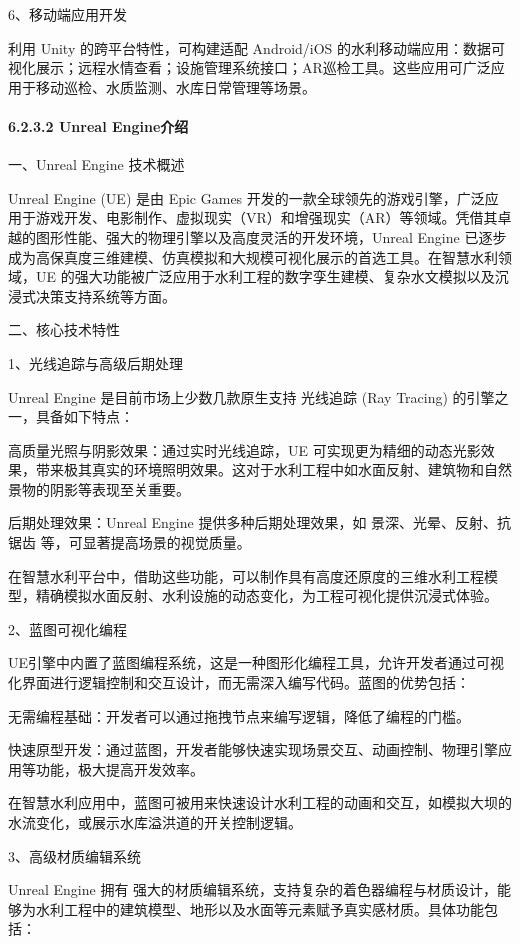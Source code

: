 6、移动端应用开发

利用 Unity 的跨平台特性，可构建适配 Android/iOS 的水利移动端应用：数据可视化展示；远程水情查看；设施管理系统接口；AR巡检工具。这些应用可广泛应用于移动巡检、水质监测、水库日常管理等场景。

\paragraph{6.2.3.2 Unreal Engine介绍}\label{unreal-engineux4ecbux7ecd}

一、Unreal Engine 技术概述

Unreal Engine (UE) 是由 Epic Games 开发的一款全球领先的游戏引擎，广泛应用于游戏开发、电影制作、虚拟现实（VR）和增强现实（AR）等领域。凭借其卓越的图形性能、强大的物理引擎以及高度灵活的开发环境，Unreal Engine 已逐步成为高保真度三维建模、仿真模拟和大规模可视化展示的首选工具。在智慧水利领域，UE 的强大功能被广泛应用于水利工程的数字孪生建模、复杂水文模拟以及沉浸式决策支持系统等方面。

二、核心技术特性

1、光线追踪与高级后期处理

Unreal Engine 是目前市场上少数几款原生支持 光线追踪 (Ray Tracing) 的引擎之一，具备如下特点：

高质量光照与阴影效果：通过实时光线追踪，UE 可实现更为精细的动态光影效果，带来极其真实的环境照明效果。这对于水利工程中如水面反射、建筑物和自然景物的阴影等表现至关重要。

后期处理效果：Unreal Engine 提供多种后期处理效果，如 景深、光晕、反射、抗锯齿 等，可显著提高场景的视觉质量。

在智慧水利平台中，借助这些功能，可以制作具有高度还原度的三维水利工程模型，精确模拟水面反射、水利设施的动态变化，为工程可视化提供沉浸式体验。

2、蓝图可视化编程

UE引擎中内置了蓝图编程系统，这是一种图形化编程工具，允许开发者通过可视化界面进行逻辑控制和交互设计，而无需深入编写代码。蓝图的优势包括：

无需编程基础：开发者可以通过拖拽节点来编写逻辑，降低了编程的门槛。

快速原型开发：通过蓝图，开发者能够快速实现场景交互、动画控制、物理引擎应用等功能，极大提高开发效率。

在智慧水利应用中，蓝图可被用来快速设计水利工程的动画和交互，如模拟大坝的水流变化，或展示水库溢洪道的开关控制逻辑。

3、高级材质编辑系统

Unreal Engine 拥有 强大的材质编辑系统，支持复杂的着色器编程与材质设计，能够为水利工程中的建筑模型、地形以及水面等元素赋予真实感材质。具体功能包括：

